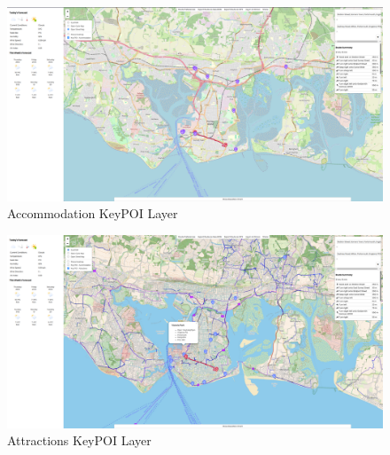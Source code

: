 \begin{figure}[!ht]
    \centering
    \includegraphics[width=425px]{figures/Progress Images/Iteration-2/SR40-45/SR41 - Accommodation KeyPOI.png}
    \caption{Accommodation KeyPOI Layer}
    \label{fig:accommodation-layer}
\end{figure}

\begin{figure}[!ht]
    \centering
    \includegraphics[width=425px]{figures/Progress Images/Iteration-2/SR40-45/SR42 - Attractions KeyPOI.png}
    \caption{Attractions KeyPOI Layer}
    \label{fig:attractions-layer}
\end{figure}

